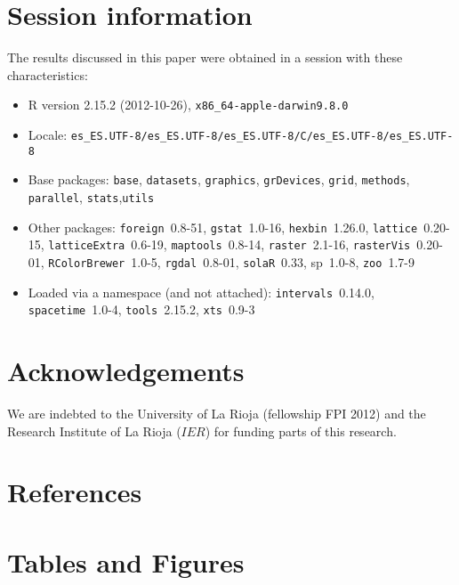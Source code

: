 \documentclass[authoryear, sort&compress]{elsarticle}
\begin{document}
\section*{Session information}
\label{sec:session}

The results discussed in this paper were obtained in a session with
these characteristics:

\begin{itemize}\raggedright
  \item R version 2.15.2 (2012-10-26), \verb|x86_64-apple-darwin9.8.0|
  \item Locale: \verb|es_ES.UTF-8/es_ES.UTF-8/es_ES.UTF-8/C/es_ES.UTF-8/es_ES.UTF-8|
  \item Base packages: \texttt{base}, \texttt{datasets}, \texttt{graphics}, \texttt{grDevices}, \texttt{grid}, \texttt{methods}, \texttt{parallel}, \texttt{stats},\texttt{utils}
  \item Other packages: \texttt{foreign}~0.8-51, \texttt{gstat}~1.0-16, \texttt{hexbin}~1.26.0, \texttt{lattice}~0.20-15,
    \texttt{latticeExtra}~0.6-19, \texttt{maptools}~0.8-14, \texttt{raster}~2.1-16, \texttt{rasterVis}~0.20-01,
    \texttt{RColorBrewer}~1.0-5, \texttt{rgdal}~0.8-01, \texttt{solaR}~0.33, sp~1.0-8, \texttt{zoo}~1.7-9
  \item Loaded via a namespace (and not attached): \texttt{intervals}~0.14.0, \texttt{spacetime}~1.0-4,
    \texttt{tools}~2.15.2, \texttt{xts}~0.9-3
\end{itemize}


\section*{Acknowledgements}
We are indebted to the University of La Rioja (fellowship FPI 2012)
and the Research Institute of La Rioja ($IER$) for funding parts of
this research.

\section*{References}



\clearpage
\section*{Tables and Figures}
\end{document}
